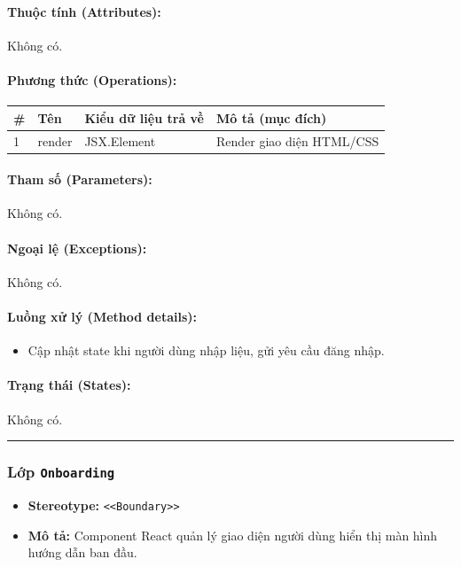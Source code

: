 \documentclass[12pt,a4paper]{article}
\begin{document}
\paragraph{Thuộc tính (Attributes):}
Không có.

\paragraph{Phương thức (Operations):}
\begin{longtable}{|p{0.6cm}|p{3.8cm}|p{2.6cm}|p{6.5cm}|}
\hline
\textbf{\#} & \textbf{Tên} & \textbf{Kiểu dữ liệu trả về} & \textbf{Mô tả (mục đích)} \\ \hline
\endhead
1 & render & JSX.Element & Render giao diện HTML/CSS \\ \hline
\end{longtable}

\paragraph{Tham số (Parameters):}
Không có.

\paragraph{Ngoại lệ (Exceptions):}
Không có.

\paragraph{Luồng xử lý (Method details):}
\begin{itemize}[leftmargin=*]
    \item Cập nhật state khi người dùng nhập liệu, gửi yêu cầu đăng nhập.
\end{itemize}


\paragraph{Trạng thái (States):}
Không có.

\vskip 0.5cm
\noindent\rule{\textwidth}{0.5pt}
\vskip 0.5cm

\subsubsection{Lớp \texttt{Onboarding}}
\begin{itemize}[leftmargin=*]
    \item \textbf{Stereotype:} \texttt{\textless{}\textless{}Boundary\textgreater{}\textgreater{}}
    \item \textbf{Mô tả:} Component React quản lý giao diện người dùng hiển thị màn hình hướng dẫn ban đầu.
\end{itemize}
\end{document}
